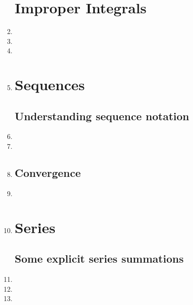 \documentclass{article}
\begin{document}
\begin{enumerate}
\section{Improper Integrals}
\item 

\item 
\item 

\item 

\section{Sequences}
\subsection{Understanding sequence notation}
\item

\item

\item


\subsection{Convergence}
\item

\item

\section{Series}
\subsection{Some explicit series summations}
\item 
\item 
\item 



\end{enumerate}
\end{document}
